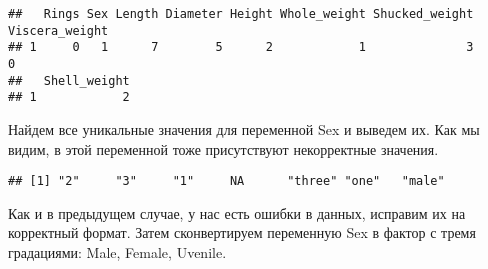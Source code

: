 \documentclass[]{article}
\newenvironment{Shaded}{\begin{snugshade}}{\end{snugshade}}
\newcommand{\CommentTok}[1]{\textcolor[rgb]{0.56,0.35,0.01}{\textit{#1}}}
\newcommand{\DataTypeTok}[1]{\textcolor[rgb]{0.13,0.29,0.53}{#1}}
\newcommand{\KeywordTok}[1]{\textcolor[rgb]{0.13,0.29,0.53}{\textbf{#1}}}
\newcommand{\NormalTok}[1]{#1}
\newcommand{\OperatorTok}[1]{\textcolor[rgb]{0.81,0.36,0.00}{\textbf{#1}}}
\newcommand{\OtherTok}[1]{\textcolor[rgb]{0.56,0.35,0.01}{#1}}
\newcommand{\StringTok}[1]{\textcolor[rgb]{0.31,0.60,0.02}{#1}}
\begin{document}
\begin{Shaded}
\end{Shaded}

\begin{verbatim}
##   Rings Sex Length Diameter Height Whole_weight Shucked_weight Viscera_weight
## 1     0   1      7        5      2            1              3              0
##   Shell_weight
## 1            2
\end{verbatim}

Найдем все уникальные значения для переменной Sex и выведем их. Как мы
видим, в этой переменной тоже присутствуют некорректные значения.

\begin{Shaded}
\end{Shaded}

\begin{verbatim}
## [1] "2"     "3"     "1"     NA      "three" "one"   "male"
\end{verbatim}

Как и в предыдущем случае, у нас есть ошибки в данных, исправим их на
корректный формат. Затем сконвертируем переменную Sex в фактор с тремя
градациями: Male, Female, Uvenile.
\end{document}
